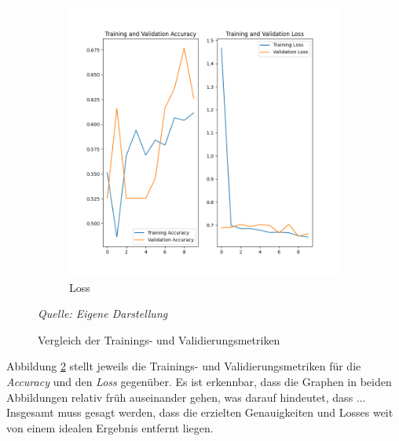 \begin{figure}[!h]
\begin{subfigure}[b]{0.49\textwidth}
        \includegraphics[width=\textwidth]{abbildungen/loss_train_val.png}
        \caption {Loss}
        \label{fig:metricsTrainLoss}
    \end{subfigure}
    \caption {Vergleich der Trainings- und Validierungsmetriken}
    \label{fig:metricsTrain}
    \textit{Quelle: Eigene Darstellung}
    \\
\end{figure}
Abbildung \ref{fig:metricsTrain} stellt jeweils die Trainings- und Validierungsmetriken für die \textit{Accuracy} und den \textit{Loss} gegenüber.
Es ist erkennbar, dass die Graphen in beiden Abbildungen relativ früh auseinander gehen, was darauf hindeutet, dass ...
Insgesamt muss gesagt werden, dass die erzielten Genauigkeiten und Losses weit von einem idealen Ergebnis entfernt liegen.

